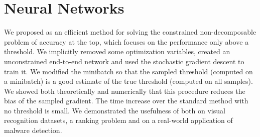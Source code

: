 \section{Neural Networks}

We proposed \DeepTopPush as an efficient method for solving the constrained non-decomposable problem of accuracy at the top, which focuses on the performance only above a threshold. We implicitly removed some optimization variables, created an unconstrained end-to-end network and used the stochastic gradient descent to train it. We modified the minibatch so that the sampled threshold (computed on a minibatch) is a good estimate of the true threshold (computed on all samples). We showed both theoretically and numerically that this procedure reduces the bias of the sampled gradient. The time increase over the standard method with no threshold is small. We demonstrated the usefulness of \DeepTopPush both on visual recognition datasets, a ranking problem and on a real-world application of malware detection.
